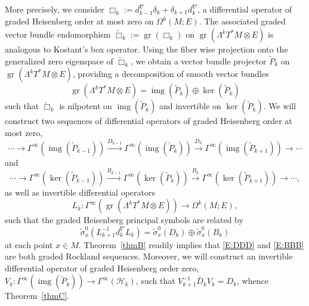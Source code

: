 \documentclass[reqno,12pt]{amsart}
\DeclareMathOperator{\img}{img}
\DeclareMathOperator{\gr}{gr}
\theoremstyle{plain}
\theoremstyle{definition}
\begin{document}
More precisely, we consider $\Box_k:=d^\nabla_{k-1}\delta_k+\delta_{k+1}d^\nabla_k$, a differential operator of graded Heisenberg order at most zero on $\Omega^k(M;E)$.
The associated graded vector bundle endomorphism $\tilde\Box_k:=\gr(\Box_k)$ on $\gr(\Lambda^kT^*M\otimes E)$ is analogous to Kostant's box operator.
Using the fiber wise projection onto the generalized zero eigenspace of $\tilde\Box_k$, we obtain a vector bundle projector $\tilde P_k$ on $\gr(\Lambda^kT^*M\otimes E)$, providing a decomposition of smooth vector bundles
$$
\gr(\Lambda^kT^*M\otimes E)=\img(\tilde P_k)\oplus\ker(\tilde P_k)
$$
such that $\tilde\Box_k$ is nilpotent on $\img(\tilde P_k)$ and invertible on $\ker(\tilde P_k)$.
We will construct two sequences of differential operators of graded Heisenberg order at most zero,
\begin{equation}\label{E:DDD}
\cdots\to\Gamma^\infty(\img(\tilde P_{k-1}))\xrightarrow{D_{k-1}}\Gamma^\infty(\img(\tilde P_k))\xrightarrow{D_k}\Gamma^\infty(\img(\tilde P_{k+1}))\to\cdots
\end{equation}
and
\begin{equation}\label{E:BBB}
\cdots\to\Gamma^\infty(\ker(\tilde P_{k-1}))\xrightarrow{B_{k-1}}\Gamma^\infty(\ker(\tilde P_k))\xrightarrow{B_k}\Gamma^\infty(\ker(\tilde P_{k+1}))\to\cdots,
\end{equation}
as well as invertible differential operators 
$$
L_k\colon\Gamma^\infty(\gr(\Lambda^kT^*M\otimes E))\to\Omega^k(M;E),
$$
such that the graded Heisenberg principal symbols are related by 
$$
\tilde\sigma^0_x(L^{-1}_{k+1}d_k^\nabla L_k)=\tilde\sigma^0_x(D_k)\oplus\tilde\sigma^0_x(B_k)
$$
at each point $x\in M$.
Theorem~\ref{thmB} readily implies that \eqref{E:DDD} and \eqref{E:BBB} are both graded Rockland sequences.
Moreover, we will construct an invertible differential operator of graded Heisenberg order zero, $V_k\colon\Gamma^\infty(\img(\tilde P_k))\to\Gamma^\infty(\mathcal H_k)$, such that $V_{k+1}^{-1}\bar D_kV_k=D_k$, whence Theorem~\ref{thmC}.
\end{document}
